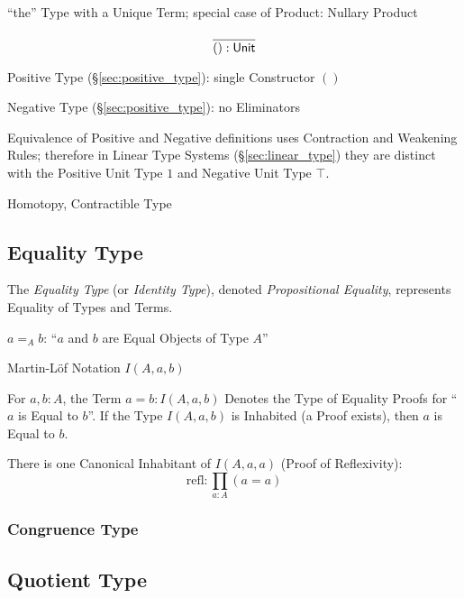 ``the'' Type with a Unique Term; special case of Product: Nullary
Product

\[
  \frac{}
  {():\mathsf{Unit}}
\]

Positive Type (\S\ref{sec:positive_type}): single Constructor $()$

Negative Type (\S\ref{sec:positive_type}): no Eliminators

Equivalence of Positive and Negative definitions uses Contraction and
Weakening Rules; therefore in Linear Type Systems
(\S\ref{sec:linear_type}) they are distinct with the Positive Unit
Type $1$ and Negative Unit Type $\top$.

Homotopy, Contractible Type %



\subsection{Equality Type}\label{sec:equality_type}

The \emph{Equality Type} (or \emph{Identity Type}), denoted
\emph{Propositional Equality}, represents Equality of Types and Terms.

$a =_A b$: ``$a$ and $b$ are Equal Objects of Type $A$''

Martin-L\"of Notation $I(A,a,b)$

For $a,b:A$, the Term $a = b : I(A,a,b)$ Denotes the Type of Equality
Proofs for ``$a$ is Equal to $b$''. If the Type $I(A,a,b)$ is
Inhabited (a Proof exists), then $a$ is Equal to $b$.

There is one Canonical Inhabitant of $I(A,a,a)$ (Proof of
Reflexivity):
\[
  \text{refl}: \prod_{a:A} (a=a)
\]



\subsubsection{Congruence Type}\label{sec:congruence_type}




\subsection{Quotient Type}\label{sec:quotient_type}\hfill

